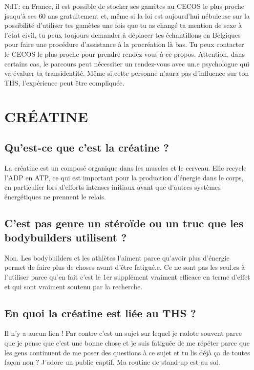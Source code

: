 \documentclass{article}
\begin{document}
NdT: en France, il est possible de stocker ses gamètes au CECOS le plus proche jsuqu'à ses 60 ans gratuitement et, même si la loi est aujourd'hui nébuleuse sur la possibilité d'utiliser tes gamètes une fois que tu as changé ta mention de sexe à l'état civil, tu peux toujours demander à déplacer tes échantillons en Belgiques pour faire une procédure d'assistance à la procréation là bas. Tu peux contacter le CECOS le plus proche pour prendre rendez-vous à ce propos. Attention, dans certains cas, le parcours peut nécessiter un rendez-vous avec un.e psychologue qui va évaluer ta transidentité. Même si cette personne n'aura pas d'influence sur ton THS, l'expérience peut être compliquée.

\section{CRÉATINE}

\subsection{Qu'est-ce que c'est la créatine ?}

La créatine est un composé organique dans les muscles et le cerveau. Elle recycle l'ADP en ATP, ce qui est important pour la production d'énergie dans le corps, en particulier lors d'efforts intenses initiaux avant que d'autres systèmes énergétiques ne prennent le relais.

\subsection{C'est pas genre un stéroïde ou un truc que les bodybuilders utilisent ?}

Non. Les bodybuilders et les athlètes l'aiment parce qu'avoir plus d'énergie permet de faire plus de choses avant d'être fatigué.e. Ce ne sont pas les seul.es à l'utiliser parce qu'en fait c'est le 1er supplément vraiment efficace en terme d'effet et qui sont vraiment soutenu par la recherche.

\subsection{En quoi la créatine est liée au THS ?}

Il n'y a aucun lien ! Par contre c'est un sujet sur lequel je radote souvent parce que je pense que c'est une bonne chose et je suis fatiguée de me répéter parce que les gens continuent de me poser des questions à ce sujet et tu lis déjà ça de toutes façon non ? J'adore un public captif. Ma routine de stand-up est au sol.
\end{document}
